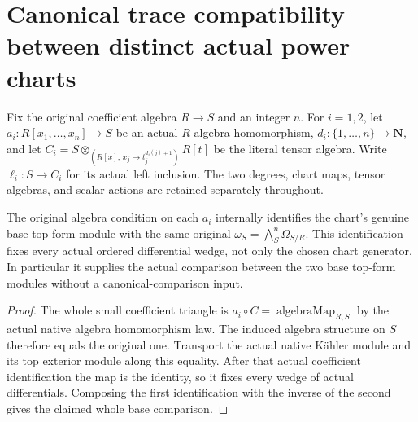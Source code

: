 \section{Canonical trace compatibility between distinct actual power charts}
\label{sec:kn-nadel-kummer-cross-chart}

Fix the original coefficient algebra $R\to S$ and an integer $n$.
For $i=1,2$, let $a_i:R[x_1,\ldots,x_n]\to S$ be an actual
$R$-algebra homomorphism, $d_i:\{1,\ldots,n\}\to\mathbf N$, and
let $C_i=S\otimes_{(R[x],\,x_j\mapsto t_j^{d_i(j)+1})}R[t]$ be
the literal tensor algebra.  Write $\ell_i:S\to C_i$ for its actual
left inclusion.  The two degrees, chart maps, tensor algebras, and
scalar actions are retained separately throughout.

\begin{lemma}
\label{lem:kn-nadel-cross-chart-original-coefficients}
\leanok
The original algebra condition on each $a_i$ internally identifies
the chart's genuine base top-form module with the same original
$\omega_S=\bigwedge^n_S\Omega_{S/R}$.  This identification fixes
every actual ordered differential wedge, not only the chosen chart
generator.  In particular it supplies the actual comparison between
the two base top-form modules without a canonical-comparison input.
\end{lemma}
\begin{proof}
The whole small coefficient triangle is
$a_i\circ C=\operatorname{algebraMap}_{R,S}$ by the actual native
algebra homomorphism law.  The induced algebra structure on $S$
therefore equals the original one.  Transport the actual native
K\"ahler module and its top exterior module along this equality.
After that actual coefficient identification the map is the identity,
so it fixes every wedge of actual differentials.  Composing the first
identification with the inverse of the second gives the claimed
whole base comparison.
\end{proof}

